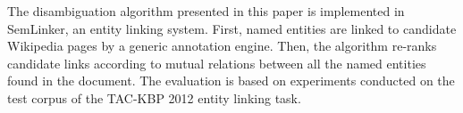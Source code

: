 The disambiguation algorithm presented in this paper is implemented in SemLinker, an entity linking system. First, named entities are linked to candidate Wikipedia pages by a generic annotation engine. Then, the algorithm re-ranks candidate links according to mutual relations between all the named entities found in the document. The evaluation is based on experiments conducted on the test corpus of the TAC-KBP 2012 entity linking task.
